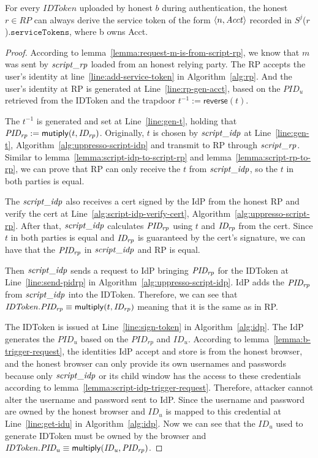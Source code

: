   \begin{lemma}
    For every $IDToken$ uploaded by honest $b$ during authentication, 
    the honest $r \in RP$ can always derive the service token of the form 
    $\langle {{}n, \mathit{Acct}} \rangle$ recorded in $S^j$($r$).$\mathtt{serviceTokens}$, where b owns Acct. 
  \end{lemma}
  \begin{proof}
    According to lemma~\ref{lemma:request-m-is-from-script-rp}, 
    we know that $m$ was sent by $\mathit{script\_rp}$ loaded from an honest relying party. 
    The RP accepts the user's identity at line~\ref{line:add-service-token} in Algorithm~\ref{alg:rp}.
    And the user's identity at RP is generated at Line~\ref{line:rp-gen-acct}, 
    based on the $PID_u$ retrieved from the IDToken and the trapdoor $t^{-1} := \mathsf{reverse}(t)$. 
    
    The $t^{-1}$ is generated and set at Line~\ref{line:gen-t}, 
    holding that $\mathit{PID_{rp}} := \mathsf{mutiply}(t, \mathit{ID_{rp}})$.
    Originally, $t$ is chosen by $\mathit{script\_idp}$ at Line~\ref{line:gen-t}, Algorithm~\ref{alg:uppresso-script-idp} 
    and transmit to RP through $\mathit{script\_rp}$.
    Similar to lemma~\ref{lemma:script-idp-to-script-rp} and lemma~\ref{lemma:script-rp-to-rp}, 
    we can prove that RP can only receive the $t$ from $\mathit{script\_idp}$, so the $t$ in both parties is equal.

    The $\mathit{script\_idp}$ also receives a cert signed by the IdP from the honest RP and verify the cert at Line~\ref{alg:script-idp-verify-cert}, Algorithm~\ref{alg:uppresso-script-rp}.
    After that, $\mathit{script\_idp}$ calculates $\mathit{PID_{rp}}$ using $t$ and $\mathit{ID_{rp}}$ from the cert.
    Since $t$ in both parties is equal and $\mathit{ID_{rp}}$ is guaranteed by the cert's signature, 
    we can have that the $\mathit{PID_{rp}}$ in $\mathit{script\_idp}$ and RP is equal.

    Then $\mathit{script\_idp}$ sends a request to IdP bringing $\mathit{PID_{rp}}$ for the IDToken 
    at Line~\ref{line:send-pidrp} in Algorithm~\ref{alg:uppresso-script-idp}.
    IdP adds the $\mathit{PID_{rp}}$ from $\mathit{script\_idp}$ into the IDToken.
    Therefore, we can see that 
    $\mathit{IDToken}.\mathit{PID_{rp}} \equiv \mathsf{multiply}(t, \mathit{ID_{rp}})$ meaning that it is the same as in RP.


    The IDToken is issued at Line~\ref{line:sign-token} in Algorithm~\ref{alg:idp}.
    The IdP generates the $PID_u$ based on the $PID_{rp}$ and $ID_u$.
    According to lemma~\ref{lemma:b-trigger-request}, 
    the identities IdP accept and store is from the honest browser, 
    and the honest browser can only provide its own usernames and passwords 
    because only $\mathit{script\_idp}$ or its child window has the access to these credentials 
    according to lemma~\ref{lemma:script-idp-trigger-request}.
    Therefore, attacker cannot alter the username and password sent to IdP.
    Since the username and password are owned by the honest browser and 
    $ID_u$ is mapped to this credential at Line~\ref{line:get-idu} in Algorithm~\ref{alg:idp}. 
    Now we can see that the $ID_u$ used to generate IDToken must be owned by the browser 
    and $\mathit{IDToken}.\mathit{PID_{u}} \equiv \mathsf{multiply}(\mathit{ID_u}, \mathit{PID_{rp}})$.
    


\end{proof}
